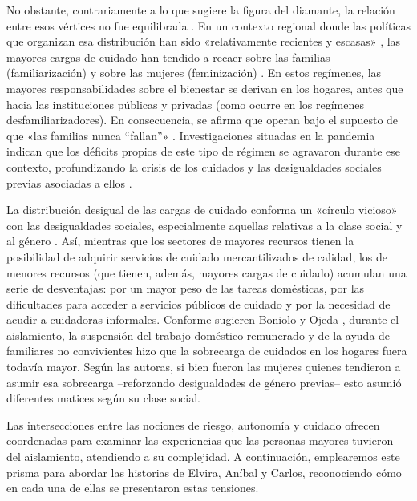 \begin{refsection}
No obstante, contrariamente a lo que sugiere la figura del diamante, la relación entre esos vértices no fue equilibrada \protect\parencite{4212-CEMINARI2018}. En un contexto regional donde las políticas que organizan esa distribución han sido «relativamente recientes y escasas» \protect\parencite[pág.~28]{4213-RICO2016}, las mayores cargas de cuidado han tendido a recaer sobre las familias (familiarización) y sobre las mujeres (feminización) \protect\parencite{4202-BONIOLO2024,4204-VEGASOLIS2017,4174-BATTHYANY2021}. En estos regímenes, las mayores responsabilidades sobre el bienestar se derivan en los hogares, antes que hacia las instituciones públicas y privadas (como ocurre en los regímenes desfamiliarizadores). En consecuencia, se afirma que operan bajo el supuesto de que «las familias nunca “fallan”» \protect\parencite[pág.~27]{4173-LOPEZ2009}. Investigaciones situadas en la pandemia indican que los déficits propios de este tipo de régimen se agravaron durante ese contexto, profundizando la crisis de los cuidados y las desigualdades sociales previas asociadas a ellos \protect\parencite{4202-BONIOLO2024,4210-MOGUILLANSKY2024}.

La distribución desigual de las cargas de cuidado conforma un «círculo vicioso» con las desigualdades sociales, especialmente aquellas relativas a la clase social y al género \protect\parencite{4174-BATTHYANY2021}. Así, mientras que los sectores de mayores recursos tienen la posibilidad de adquirir servicios de cuidado mercantilizados de calidad, los de menores recursos (que tienen, además, mayores cargas de cuidado) acumulan una serie de desventajas: por un mayor peso de las tareas domésticas, por las dificultades para acceder a servicios públicos de cuidado y por la necesidad de acudir a cuidadoras informales. Conforme sugieren Boniolo y Ojeda \protect\parencite*{4202-BONIOLO2024}, durante el aislamiento, la suspensión del trabajo doméstico remunerado y de la ayuda de familiares no convivientes hizo que la sobrecarga de cuidados en los hogares fuera todavía mayor. Según las autoras, si bien fueron las mujeres quienes tendieron a asumir esa sobrecarga –reforzando desigualdades de género previas– esto asumió diferentes matices según su clase social.

Las intersecciones entre las nociones de riesgo, autonomía y cuidado ofrecen coordenadas para examinar las experiencias que las personas mayores tuvieron del aislamiento, atendiendo a su complejidad. A continuación, emplearemos este prisma para abordar las historias de Elvira, Aníbal y Carlos, reconociendo cómo en cada una de ellas se presentaron estas tensiones.



\end{refsection}
